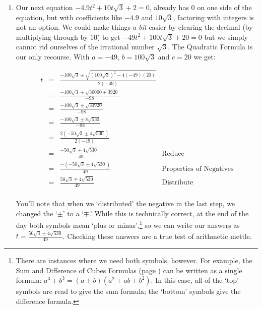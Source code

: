 \documentclass{ximera}
\begin{document}
\begin{example}
\begin{explanation}
\begin{enumerate}
\[\begin{array}{rclr}
& = & \frac{420 \pm 0}{200} & \\  
& = & \frac{420}{200} & \\  

& = & \frac{21}{10} & \\

\end{array} \]

To our surprise and delight we obtain just one answer, $x = \frac{21}{10}$.

\item  Our next equation $-4.9t^2 + 10t\sqrt{3} + 2 = 0$, already has $0$ on one side of the equation, but with coefficients like $-4.9$ and $10\sqrt{3}$, factoring with integers is not an option.  We could make things a \textit{bit} easier by clearing the decimal (by multiplying through by $10$) to get  $-49t^2 + 100t\sqrt{3} + 20 = 0$ but we simply cannot rid ourselves of the irrational number $\sqrt{3}$.  The Quadratic Formula is our only recourse.  With $a = -49$, $b = 100\sqrt{3}$ and $c = 20$ we get: 

\[ \begin{array}{rclr}

t & = &  \frac{-100\sqrt{3} \pm \sqrt{(100\sqrt{3})^2 - 4(-49)(20)}}{2(-49)} & \\  

& = &  \frac{-100\sqrt{3} \pm \sqrt{30000 +3920}}{-98}  & \\  

& = &  \frac{-100\sqrt{3} \pm \sqrt{33920}}{-98}  & \\  

& = &  \frac{-100\sqrt{3} \pm 8\sqrt{530}}{-98}  & \\  

& = &  \frac{2(-50\sqrt{3} \pm 4\sqrt{530})}{2(-49)}  & \\  

& = &  \frac{-50\sqrt{3} \pm 4\sqrt{530}}{-49}  & \text{Reduce} \\  

& = &  \frac{-(-50\sqrt{3} \pm 4\sqrt{530})}{49}  & \text{Properties of Negatives} \\  

& = & \frac{50\sqrt{3} \mp 4\sqrt{530}}{49} & \text{Distribute} \\ 

\end{array}\]

You'll note that when we `distributed' the negative in the last step, we changed the `$\pm$' to a `$\mp$.'  While this is technically correct, at the end of the day both symbols mean `plus or minus',\footnote{There are instances where we need both symbols, however.  For example, the Sum and Difference of Cubes Formulas (page \pageref{CommonFactoringFormulas}) can be written as a single formula:  $a^3 \pm b^3 = (a \pm b) (a^2 \mp ab + b^2)$.  In this case, all of the `top' symbols are read to give the sum formula;  the `bottom' symbols give the difference formula.} so we can write our answers as $t =  \frac{50\sqrt{3} \pm 4\sqrt{530}}{49}$. Checking these answers are a true test of arithmetic mettle.


\end{enumerate}
\end{explanation}
\end{example}
\end{document}
